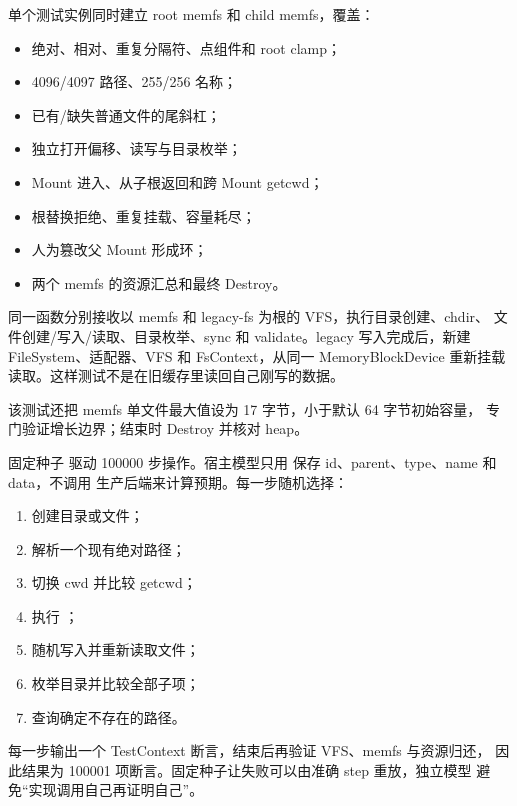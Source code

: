 
单个测试实例同时建立 root memfs 和 child memfs，覆盖：

\begin{itemize}
  \item 绝对、相对、重复分隔符、点组件和 root clamp；
  \item 4096/4097 路径、255/256 名称；
  \item 已有/缺失普通文件的尾斜杠；
  \item 独立打开偏移、读写与目录枚举；
  \item Mount 进入、从子根返回和跨 Mount getcwd；
  \item 根替换拒绝、重复挂载、容量耗尽；
  \item 人为篡改父 Mount 形成环；
  \item 两个 memfs 的资源汇总和最终 Destroy。
\end{itemize}


同一函数分别接收以 memfs 和 legacy-fs 为根的 VFS，执行目录创建、chdir、
文件创建/写入/读取、目录枚举、sync 和 validate。legacy 写入完成后，新建
FileSystem、适配器、VFS 和 FsContext，从同一 MemoryBlockDevice 重新挂载
读取。这样测试不是在旧缓存里读回自己刚写的数据。

该测试还把 memfs 单文件最大值设为 17 字节，小于默认 64 字节初始容量，
专门验证增长边界；结束时 Destroy 并核对 heap。


固定种子  驱动 100000 步操作。宿主模型只用
 保存 id、parent、type、name 和 data，不调用
生产后端来计算预期。每一步随机选择：

\begin{enumerate}
  \item 创建目录或文件；
  \item 解析一个现有绝对路径；
  \item 切换 cwd 并比较 getcwd；
  \item 执行 ；
  \item 随机写入并重新读取文件；
  \item 枚举目录并比较全部子项；
  \item 查询确定不存在的路径。
\end{enumerate}

每一步输出一个 TestContext 断言，结束后再验证 VFS、memfs 与资源归还，
因此结果为 100001 项断言。固定种子让失败可以由准确 step 重放，独立模型
避免“实现调用自己再证明自己”。

